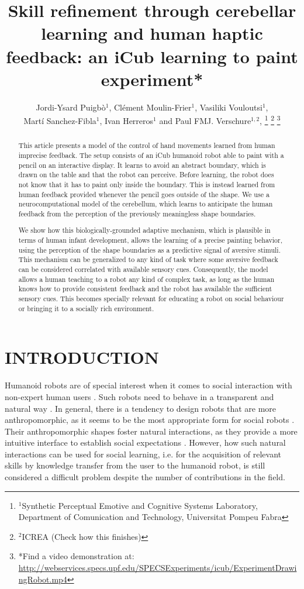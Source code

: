 \documentclass[letterpaper, 10 pt, conference]{ieeeconf}  %
\title{\LARGE \bf
Skill refinement through cerebellar learning and human haptic feedback:
an iCub learning to paint experiment*
}
\author{Jordi-Ysard Puigb\`o$^{1}$, Cl\'{e}ment Moulin-Frier$^{1}$, Vasiliki Vouloutsi$^{1}$,\\ Mart\'i Sanchez-Fibla$^{1}$, Ivan Herreros$^{1}$ and Paul FMJ. Verschure$^{1,2}$, %
\thanks{$^{1}$Synthetic Perceptual Emotive and Cognitive Systems Laboratory, Department of Comunication and Technology, Universitat Pompeu Fabra}%
\thanks{$^{2}$ICREA (Check how this finishes)
        }%
\thanks{*Find a video demonstration at: \url{http://webservices.specs.upf.edu/SPECSExperiments/icub/ExperimentDrawingRobot.mp4}}%
}
\begin{document}
\maketitle
\thispagestyle{empty}
\pagestyle{empty}


\begin{abstract}
This article presents a model of the control of hand movements learned from human imprecise feedback. 
The setup consists of an iCub humanoid robot able to paint with a pencil on an interactive display. It learns to avoid an abstract boundary, which is drawn on the table and that the robot can perceive. Before learning, the robot does not know that it has to paint only inside the boundary. This is instead learned from human feedback provided whenever the pencil goes outside of the shape. We use a neurocomputational model of the cerebellum, which learns to anticipate the human feedback from the perception of the previously meaningless shape boundaries. 

We show how this biologically-grounded adaptive mechanism, which is plausible in terms of human infant development, allows the learning of a precise painting behavior, using the perception of the shape boundaries as a predictive signal of aversive stimuli. This mechanism can be generalized to any kind of task where some aversive feedback can be considered correlated with available sensory cues. Consequently, the model allows a human teaching to a robot any kind of complex task, as long as the human knows how to provide consistent feedback and the robot has available the sufficient sensory cues. This becomes specially relevant for educating a robot on social behaviour or bringing it to a socially rich environment. 

\end{abstract}



\section{INTRODUCTION}

Humanoid robots are of special interest when it comes to social interaction with non-expert human users \cite{goodrich2007human}. Such robots need to behave in a transparent and natural way \cite{breazeal2009role}. In general, there is a tendency to design robots that are more anthropomorphic, as it seems to be the most appropriate form for social robots \cite{disalvo2002all}. Their anthropomorphic shapes foster natural interactions, as they provide a more intuitive interface to establish social expectations \cite{duffy2003anthropomorphism}. However, how such natural interactions can be used for social learning, i.e. for the acquisition of relevant skills by knowledge transfer from the user to the humanoid robot, is still considered a difficult problem despite the number of contributions in the field. 
\end{document}

